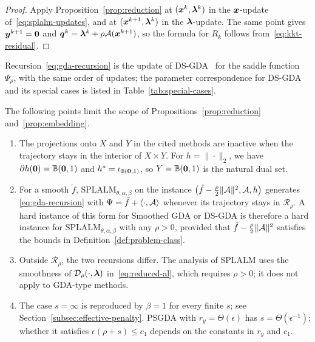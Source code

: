 \begin{proof}
Apply Proposition~\ref{prop:reduction} at \((\bm{x}^k,\bm{\lambda}^k)\) in the
\(\bm{x}\)-update of~\eqref{eq:splalm-updates}, and at \((\bm{x}^{k+1},\bm{\lambda}^k)\) in
the \(\bm{\lambda}\)-update. The same point gives \(\bm{y}^{k+1}=\bm{0}\) and
\(\bm{q}^k=\bm{\lambda}^k+\rho\mathcal{A}(\bm{x}^{k+1})\), so the formula for \(R_k\) follows
from~\eqref{eq:kkt-residual}.
\end{proof}

Recursion~\eqref{eq:gda-recursion} is the update of
DS-GDA~\cite{zheng2023universal} for the saddle function \(\Psi_\rho\), with
the same order of updates; the parameter correspondence for DS-GDA and its
special cases is listed in Table~\ref{tab:special-cases}.

\begin{remark}
\label{rem:embedding-scope}
The following points limit the scope of Propositions~\ref{prop:reduction}
and~\ref{prop:embedding}.
\begin{enumerate}[label=(\roman*)]
\item The projections onto \(X\) and \(Y\) in the cited methods are inactive
  when the trajectory stays in the interior of \(X\times Y\). For
  \(h=\|\cdot\|_2\), we have \(\partial h(\bm{0})=\mathbb B(\bm{0},1)\) and
  \(h^*=\iota_{\mathbb B(\bm{0},1)}\), so \(Y=\mathbb B(\bm{0},1)\) is the
  natural dual set.
\item For a smooth \(\tilde f\), \(\mathrm{SPLALM}_{\theta,\alpha,\beta}\) on the instance
  \(\bigl(\tilde f-\frac{\rho}{2}\|\mathcal{A}\|^2,\mathcal{A},h\bigr)\) generates
  \eqref{eq:gda-recursion} with \(\Psi=\tilde f+\langle\cdot,\mathcal{A}\rangle\)
  whenever its trajectory stays in \(\mathcal R_\rho\). A hard instance of
  this form for Smoothed GDA or DS-GDA is therefore a hard instance for
  \(\mathrm{SPLALM}_{\theta,\alpha,\beta}\) with any \(\rho>0\), provided
  that \(\tilde f-\frac{\rho}{2}\|\mathcal{A}\|^2\) satisfies the bounds in
  Definition~\ref{def:problem-class}.
\item Outside \(\mathcal R_\rho\), the two recursions differ. The analysis of
  SPLALM uses the smoothness of \(\mathcal{D}_\rho(\cdot,\bm{\lambda})\) in~\eqref{eq:reduced-al},
  which requires \(\rho>0\); it does not apply to GDA-type methods.
\item The case \(s=\infty\) is reproduced by \(\beta=1\) for every finite
  \(s\); see Section~\ref{subsec:effective-penalty}. PSGDA with
  \(r_y=\Theta(\epsilon)\) has \(s=\Theta(\epsilon^{-1})\); whether it
  satisfies \(\epsilon(\rho+s)\le c_1\) depends on the constants in \(r_y\)
  and \(c_1\).
\end{enumerate}
\end{remark}

